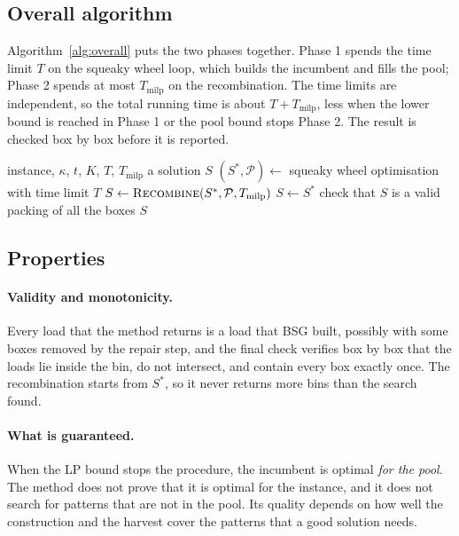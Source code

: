 \subsection{Overall algorithm}
\label{sec:m-overall}

Algorithm~\ref{alg:overall} puts the two phases together. Phase 1 spends the time limit $T$ on the
squeaky wheel loop, which builds the incumbent and fills the pool; Phase 2 spends at most
$T_{\mathrm{milp}}$ on the recombination. The time limits are independent, so the total running time
is about $T+T_{\mathrm{milp}}$, less when the lower bound is reached in Phase 1 or the pool bound
stops Phase 2. The result is checked box by box before it is reported.

\begin{algorithm}[t]
\caption{Overall method}
\label{alg:overall}
\begin{algorithmic}[1]
\Require instance, $\kappa$, $t$, $K$, $T$, $T_{\mathrm{milp}}$
\Ensure a solution $S$
\State $(S^*,\mathcal{P})\gets$ squeaky wheel optimisation with time limit $T$ 
  \State $S\gets\textsc{Recombine}(S^*,\mathcal{P},T_{\mathrm{milp}})$ 
\Else
  \State $S\gets S^*$
\EndIf
\State check that $S$ is a valid packing of all the boxes
\State \Return $S$
\end{algorithmic}
\end{algorithm}

\subsection{Properties}
\label{sec:m-prop}

\paragraph{Validity and monotonicity.}
Every load that the method returns is a load that BSG built, possibly with some boxes removed
by the repair step, and the final check verifies box by box that the loads lie inside the bin, do
not intersect, and contain every box exactly once. The recombination starts from $S^*$, so it
never returns more bins than the search found.

\paragraph{What is guaranteed.}
When the LP bound stops the procedure, the incumbent is optimal \emph{for the pool}. The method
does not prove that it is optimal for the instance, and it does not search for patterns that are
not in the pool. Its quality depends on how well the construction and the harvest cover the
patterns that a good solution needs.

